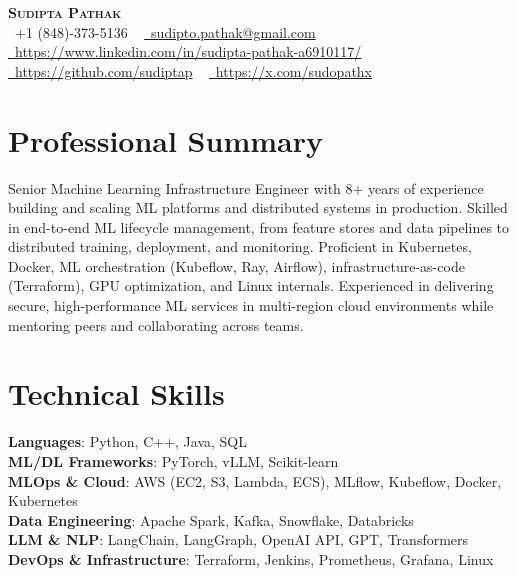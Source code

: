 \documentclass[letterpaper,11pt]{article}
\begin{document}
\begin{center}
    \textbf{\Huge \scshape Sudipta Pathak} \\ \vspace{1pt}
    \small \raisebox{-0.1\height}\faPhone\ +1 (848)-373-5136 ~ 
    \href{mailto:sudipto.pathak@email.com}{\raisebox{-0.2\height}\faEnvelope\ sudipto.pathak@gmail.com} ~ 
    \href{https://www.linkedin.com/in/sudipta-pathak-a6910117/}{\raisebox{-0.2\height}\faLinkedin\ https://www.linkedin.com/in/sudipta-pathak-a6910117/} ~
    \href{https://github.com/sudiptap}{\raisebox{-0.2\height}\faGithub\ https://github.com/sudiptap} ~
    \href{https://x.com/sudopathx}{\raisebox{-0.2\height}\faTwitter\ https://x.com/sudopathx}
    \vspace{-8pt}
\end{center}

\section{Professional Summary}
\small{Senior Machine Learning Infrastructure Engineer with 8+ years of experience building and scaling ML platforms and distributed systems in production. Skilled in end-to-end ML lifecycle management, from feature stores and data pipelines to distributed training, deployment, and monitoring. Proficient in Kubernetes, Docker, ML orchestration (Kubeflow, Ray, Airflow), infrastructure-as-code (Terraform), GPU optimization, and Linux internals. Experienced in delivering secure, high-performance ML services in multi-region cloud environments while mentoring peers and collaborating across teams.}

\section{Technical Skills}
\begin{itemize}[leftmargin=0.15in, label={}]
    \small{\item{
     \textbf{Languages}{: Python, C++, Java, SQL} \\
     \textbf{ML/DL Frameworks}{: PyTorch, vLLM, Scikit-learn} \\
     \textbf{MLOps \& Cloud}{: AWS (EC2, S3, Lambda, ECS), MLflow, Kubeflow, Docker, Kubernetes} \\
     \textbf{Data Engineering}{: Apache Spark, Kafka, Snowflake, Databricks} \\
     \textbf{LLM \& NLP}{: LangChain, LangGraph, OpenAI API, GPT, Transformers} \\
     \textbf{DevOps \& Infrastructure}{: Terraform, Jenkins, Prometheus, Grafana, Linux} \\
    }}
 \end{itemize}
\end{document}
